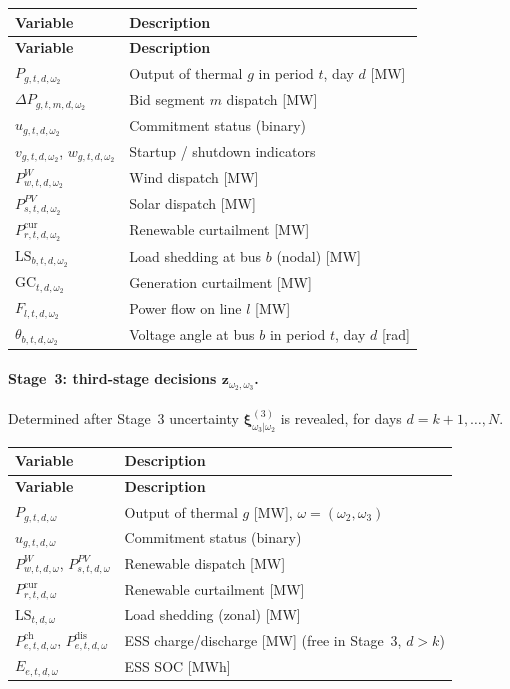 \documentclass[11pt]{article}
\newcommand{\Pch}{P^{\mathrm{ch}}}
\newcommand{\Pdis}{P^{\mathrm{dis}}}
\newcommand{\LS}{\mathrm{LS}}
\newcommand{\GC}{\mathrm{GC}}
\begin{document}
\begin{longtable}{lL{10.5cm}}
\toprule
\textbf{Variable} & \textbf{Description} \\
\midrule
\endfirsthead
\toprule
\textbf{Variable} & \textbf{Description} \\
\midrule
\endhead
$P_{g,t,d,\omega_2}$   & Output of thermal $g$ in period $t$, day $d$ [MW] \\
$\Delta P_{g,t,m,d,\omega_2}$ & Bid segment $m$ dispatch [MW] \\
$u_{g,t,d,\omega_2}$   & Commitment status (binary) \\
$v_{g,t,d,\omega_2}$, $w_{g,t,d,\omega_2}$ & Startup / shutdown indicators \\
$P^{W}_{w,t,d,\omega_2}$  & Wind dispatch [MW] \\
$P^{PV}_{s,t,d,\omega_2}$ & Solar dispatch [MW] \\
$P^{\mathrm{cur}}_{r,t,d,\omega_2}$ & Renewable curtailment [MW] \\
$\LS_{b,t,d,\omega_2}$ & Load shedding at bus $b$ (nodal) [MW] \\
$\GC_{t,d,\omega_2}$   & Generation curtailment [MW] \\
$F_{l,t,d,\omega_2}$   & Power flow on line $l$ [MW] \\
$\theta_{b,t,d,\omega_2}$ & Voltage angle at bus $b$ in period $t$, day $d$ [rad] \\
\bottomrule
\end{longtable}

\paragraph{Stage~3: third-stage decisions $\mathbf{z}_{\omega_2,\omega_3}$.}
Determined after Stage~3 uncertainty
$\boldsymbol{\xi}^{(3)}_{\omega_3|\omega_2}$ is revealed, for days
$d = k{+}1,\ldots,N$.

\begin{longtable}{lL{10.5cm}}
\toprule
\textbf{Variable} & \textbf{Description} \\
\midrule
\endfirsthead
\toprule
\textbf{Variable} & \textbf{Description} \\
\midrule
\endhead
$P_{g,t,d,\omega}$   & Output of thermal $g$ [MW],
  $\omega = (\omega_2, \omega_3)$ \\
$u_{g,t,d,\omega}$   & Commitment status (binary) \\
$P^{W}_{w,t,d,\omega}$, $P^{PV}_{s,t,d,\omega}$ & Renewable dispatch [MW] \\
$P^{\mathrm{cur}}_{r,t,d,\omega}$ & Renewable curtailment [MW] \\
$\LS_{t,d,\omega}$   & Load shedding (zonal) [MW] \\
$\Pch_{e,t,d,\omega}$, $\Pdis_{e,t,d,\omega}$ & ESS charge/discharge
  [MW] (free in Stage~3, $d > k$) \\
$E_{e,t,d,\omega}$   & ESS SOC [MWh] \\
\bottomrule
\end{longtable}
\end{document}

